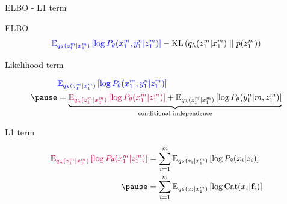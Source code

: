 \begin{frame}{ELBO - L1 term}

ELBO
\begin{equation*}
\begin{aligned}
\textcolor{blue}{\mathbb E_{q_\lambda(z_1^m|x_1^m)}\left[ \log P_\theta(x_1^m, y_1^n|z_1^m)\right]} - \operatorname{KL}\left(q_\lambda(z_1^m|x_1^m)\mid\mid p(z_1^m)\right) 
\end{aligned}
\end{equation*}

\pause

Likelihood term
\begin{small}
\begin{equation*}
\begin{aligned}
&\textcolor{blue}{\mathbb E_{q_\lambda(z_1^m|x_1^m)}\left[ \log P_\theta(x_1^m, y_1^n|z_1^m)\right]} \\ \pause
&= \underbrace{\textcolor{purple}{\mathbb E_{q_\lambda(z_1^m|x_1^m)}\left[ \log P_\theta(x_1^m|z_1^m)\right]} + \mathbb E_{q_\lambda(z_1^m|x_1^m)}\left[ \log P_\theta(y_1^n|m, z_1^m)\right]}_{\text{conditional independence}}
\end{aligned}
\end{equation*}
\end{small}

\pause
L1 term
\begin{small}
\begin{equation*}
\begin{aligned}
\textcolor{purple}{\mathbb E_{q_\lambda(z_1^m|x_1^m)}\left[ \log P_\theta(x_1^m|z_1^m)\right]} 
&= \sum_{i=1}^m \mathbb E_{q_\lambda(z_i|x_1^m)}\left[ \log P_\theta(x_i|z_i)\right] \\ \pause
&= \sum_{i=1}^m \mathbb E_{q_\lambda(z_i|x_1^m)} \left[ \log \Cat(x_i|\mathbf f_i)\right] 
\end{aligned}
\end{equation*}
\end{small}


\end{frame}



